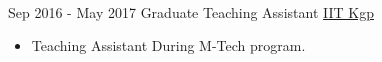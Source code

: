 \documentclass[letterpaper]{twentysecondcv} %
\begin{document}
\begin{twenty}
{\begin{itemize}
        \end{itemize}}
        \\
    \twentyitem
   		{Sep 2016 -}
		{May 2017}
        {Graduate Teaching Assistant}
        {\href{http://www.iitkgp.ac.in}{IIT Kgp}}
        {}
        {
        {\begin{itemize}
        \item Teaching Assistant During M-Tech program.
    \end{itemize}}
        }
        
\end{twenty}
\end{document}
